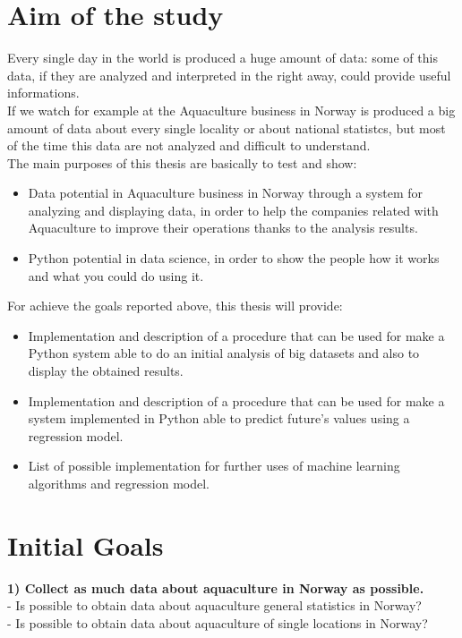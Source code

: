 


\section{Aim of the study}
Every single day in the world is produced a huge amount of data: some of this data, if they are analyzed and interpreted in the right away, could provide useful informations.\\
If we watch for example at the Aquaculture business in Norway is produced a big amount of data about every single locality or about national statistcs, but most of the time this data are not analyzed and difficult to understand.\\
The main purposes of this thesis are basically to test and show:
\begin{itemize} 
 \item 	Data potential in Aquaculture business in Norway through a system for analyzing and displaying data, in order to help the companies related with Aquaculture to improve their operations thanks to the analysis results.
 \item 	Python potential in data science, in order to show the people how it works and what you could do using it.
 \end{itemize}
For achieve the goals reported above, this thesis will provide:
\begin{itemize} 
 \item 	Implementation and description of a procedure that can be used for make a Python system able to do an initial analysis of  big datasets and also to display the obtained results.
 \item Implementation and description of a procedure that can be used for make a system implemented in Python able to predict future’s values using a regression model.
 \item List of possible implementation for further uses of machine learning algorithms and regression model.
 
 \end{itemize}

\newpage
\section{Initial Goals}

\textbf{1) Collect as much data about aquaculture in Norway as possible.}\\
- Is possible to obtain data about aquaculture general statistics in Norway?\\
- Is possible to obtain data about aquaculture of single locations in Norway?

